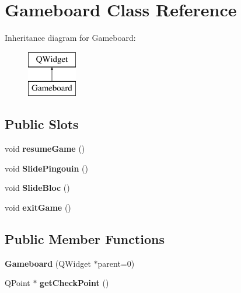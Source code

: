 \hypertarget{class_gameboard}{}\section{Gameboard Class Reference}
\label{class_gameboard}
Inheritance diagram for Gameboard\+:\begin{figure}[H]
\begin{center}
\leavevmode
\includegraphics[height=2.000000cm]{class_gameboard}
\end{center}
\end{figure}
\subsection*{Public Slots}
\begin{DoxyCompactItemize}
\item 
\hypertarget{class_gameboard_a1447e62dd9f78bcba4bdb06c4bfb8f10}{}void {\bfseries resume\+Game} ()\label{class_gameboard_a1447e62dd9f78bcba4bdb06c4bfb8f10}

\item 
\hypertarget{class_gameboard_ac59525fc331dafd4a1a290593327aa7c}{}void {\bfseries Slide\+Pingouin} ()\label{class_gameboard_ac59525fc331dafd4a1a290593327aa7c}

\item 
\hypertarget{class_gameboard_aa4e9c04466f50e1590269eab05773581}{}void {\bfseries Slide\+Bloc} ()\label{class_gameboard_aa4e9c04466f50e1590269eab05773581}

\item 
\hypertarget{class_gameboard_af76ebc877764feed7bc9d90452178f5f}{}void {\bfseries exit\+Game} ()\label{class_gameboard_af76ebc877764feed7bc9d90452178f5f}

\end{DoxyCompactItemize}
\subsection*{Public Member Functions}
\begin{DoxyCompactItemize}
\item 
\hypertarget{class_gameboard_a82157069ecfab2d2245b7d5df563aaae}{}{\bfseries Gameboard} (Q\+Widget $\ast$parent=0)\label{class_gameboard_a82157069ecfab2d2245b7d5df563aaae}

\item 
\hypertarget{class_gameboard_a2ae163b581c0ef4aae6bf1ed0ce7965a}{}Q\+Point $\ast$ {\bfseries get\+Check\+Point} ()\label{class_gameboard_a2ae163b581c0ef4aae6bf1ed0ce7965a}

\end{DoxyCompactItemize}
